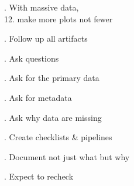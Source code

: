 \documentclass[aspectratio=169,12pt,t]{beamer}
\begin{document}
\begin{frame}{}

\vspace{-15mm} \hspace{0.4\textwidth}
       {. With massive data,} \\
\hspace{0.4\textwidth} {\color{background} 12.} {\princolorC make more plots not fewer}

\note{
}
\end{frame}


\begin{frame}{}

\vspace{-15mm} \hspace{0.4\textwidth}
{. Follow up all artifacts}

\note{
}
\end{frame}


\begin{frame}{}

\hfill
\begin{minipage}[t]{0.9\textwidth}


\bbi
\princolorD
\item[\princolorD 14.] Ask questions
\item[\princolorD 15.] Ask for the primary data
\item[\princolorD 16.] Ask for metadata
\item[\princolorD 17.] Ask why data are missing
\ei

\end{minipage}

\note{
}
\end{frame}


\begin{frame}{}

\hfill
\begin{minipage}[t]{0.9\textwidth}


\bbi
\princolorE
\item[\princolorE 18.] Create checklists \& pipelines
\item[\princolorE 19.] Document not just what but why
\item[\princolorE 20.] Expect to recheck
\ei

\end{minipage}

\note{
}
\end{frame}
\end{document}
